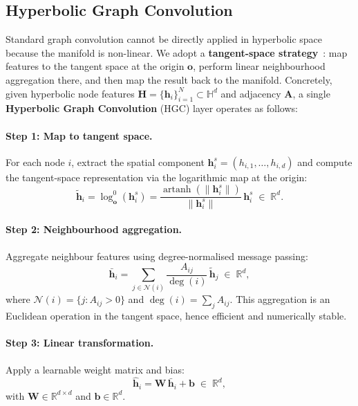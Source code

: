 \subsection{Hyperbolic Graph Convolution}\label{subsec:hyp_gcn}

Standard graph convolution cannot be directly applied in hyperbolic space because the manifold is non-linear.
We adopt a \textbf{tangent-space strategy}~\cite{chami2019hyperbolic}:
map features to the tangent space at the origin $\mathbf{o}$, perform linear neighbourhood aggregation there, and then map the result back to the manifold.
Concretely, given hyperbolic node features $\mathbf{H} = \{\mathbf{h}_i\}_{i=1}^N \subset \mathbb{H}^d$ and adjacency $\mathbf{A}$, a single \textbf{Hyperbolic Graph Convolution} (HGC) layer operates as follows:

\paragraph{Step 1: Map to tangent space.}
For each node $i$, extract the spatial component $\mathbf{h}_i^s = (h_{i,1}, \dots, h_{i,d})$ and compute the tangent-space representation via the logarithmic map at the origin:
\begin{equation}\label{eq:log_zero}
  \tilde{\mathbf{h}}_i
  = \log_{\mathbf{o}}^{0}(\mathbf{h}_i^s)
  = \frac{\operatorname{artanh}(\|\mathbf{h}_i^s\|)}{\|\mathbf{h}_i^s\|}\,\mathbf{h}_i^s
  \;\in\; \mathbb{R}^{d}.
\end{equation}

\paragraph{Step 2: Neighbourhood aggregation.}
Aggregate neighbour features using degree-normalised message passing:
\begin{equation}\label{eq:agg}
  \bar{\mathbf{h}}_i
  = \sum_{j \in \mathcal{N}(i)} \frac{A_{ij}}{\deg(i)}\,\tilde{\mathbf{h}}_j
  \;\in\; \mathbb{R}^{d},
\end{equation}
where $\mathcal{N}(i) = \{j : A_{ij} > 0\}$ and $\deg(i) = \sum_j A_{ij}$.
This aggregation is an Euclidean operation in the tangent space, hence efficient and numerically stable.

\paragraph{Step 3: Linear transformation.}
Apply a learnable weight matrix and bias:
\begin{equation}\label{eq:tangent_linear}
  \hat{\mathbf{h}}_i = \mathbf{W}\,\bar{\mathbf{h}}_i + \mathbf{b}
  \;\in\; \mathbb{R}^{d},
\end{equation}
with $\mathbf{W} \in \mathbb{R}^{d \times d}$ and $\mathbf{b} \in \mathbb{R}^d$.

